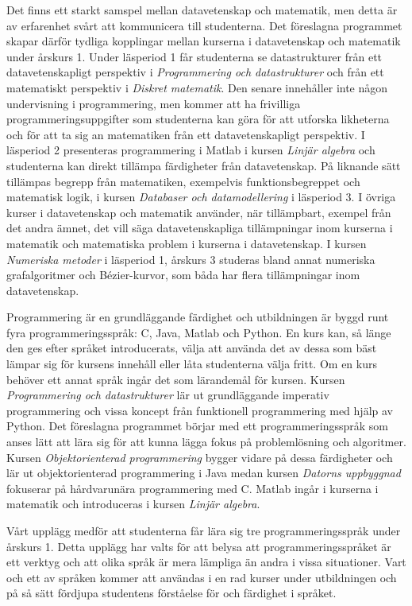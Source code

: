 Det finns ett starkt samspel mellan datavetenskap och matematik, men detta är av erfarenhet svårt att kommunicera till studenterna. Det föreslagna programmet skapar därför tydliga kopplingar mellan kurserna i datavetenskap och matematik under årskurs 1. Under läsperiod 1 får studenterna se datastrukturer från ett datavetenskapligt perspektiv i \emph{Programmering och datastrukturer} och från ett matematiskt perspektiv i \emph{Diskret matematik}. Den senare innehåller inte någon undervisning i programmering, men kommer att ha frivilliga programmeringsuppgifter som studenterna kan göra för att utforska likheterna och för att ta sig an matematiken från ett datavetenskapligt perspektiv. I läsperiod 2 presenteras programmering i Matlab i kursen \emph{Linjär algebra} och studenterna kan direkt tillämpa färdigheter från datavetenskap. På liknande sätt tillämpas begrepp från matematiken, exempelvis funktionsbegreppet och matematisk logik, i kursen \emph{Databaser och datamodellering} i läsperiod 3. I övriga kurser i datavetenskap och matematik använder, när tillämpbart, exempel från det andra ämnet, det vill säga datavetenskapliga tillämpningar inom kurserna i matematik och matematiska problem i kurserna i datavetenskap. I kursen \emph{Numeriska metoder} i läsperiod 1, årskurs 3 studeras bland annat numeriska grafalgoritmer och Bézier-kurvor, som båda har flera tillämpningar inom datavetenskap.

Programmering är en grundläggande färdighet och utbildningen är byggd runt fyra programmeringsspråk: C, Java, Matlab och Python. En kurs kan, så länge den ges efter språket introducerats, välja att använda det av dessa som bäst lämpar sig för kursens innehåll eller låta studenterna välja fritt. Om en kurs behöver ett annat språk ingår det som lärandemål för kursen. Kursen \emph{Programmering och datastrukturer} lär ut grundläggande imperativ programmering och vissa koncept från funktionell programmering med hjälp av Python. Det föreslagna programmet börjar med ett programmeringsspråk som anses lätt att lära sig för att kunna lägga fokus på problemlösning och algoritmer. Kursen \emph{Objektorienterad programmering} bygger vidare på dessa färdigheter och lär ut objektorienterad programmering i Java medan kursen \emph{Datorns uppbyggnad} fokuserar på hårdvarunära programmering med C. Matlab ingår i kurserna i matematik och introduceras i kursen \emph{Linjär algebra}.

Vårt upplägg medför att studenterna får lära sig tre programmeringsspråk under årskurs 1. Detta upplägg har valts för att belysa att programmeringsspråket är ett verktyg och att olika språk är mera lämpliga än andra i vissa situationer. Vart och ett av språken kommer att användas i en rad kurser under utbildningen och på så sätt fördjupa studentens förståelse för och färdighet i språket.

